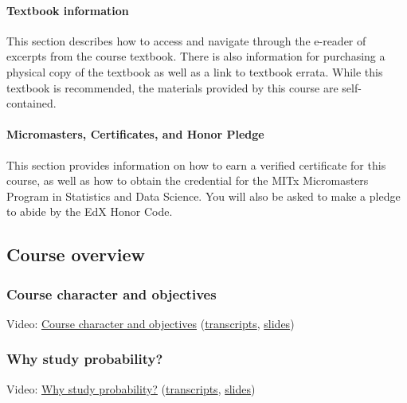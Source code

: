 \documentclass[pdftex, brazil, 12pt, twoside]{article}
\begin{document}
\paragraph{Textbook information}
This section describes how to access and navigate through the e-reader of excerpts
from the course textbook. There is also information for purchasing a physical copy
of the textbook as well as a link to textbook errata. While this textbook is
recommended, the materials provided by this course are self-contained.

\paragraph{Micromasters, Certificates, and Honor Pledge}
This section provides information on how to earn a verified certificate for this
course, as well as how to obtain the credential for the MITx Micromasters Program
in Statistics and Data Science. You will also be asked to make a pledge to abide
by the EdX Honor Code.


\subsection{Course overview}
\label{ovw0-co}

\subsubsection{Course character and objectives}
\label{ovw0-co-objectives}

Video: \href{https://www.youtube.com/watch?v=OM3iEZGC2-k}{Course character and objectives}
(\href{Unit-0/Overview1\_transcripts.pdf}{transcripts}, \href{Unit-0/Overview1\_slides.pdf}{slides})

\subsubsection{Why study probability?}
\label{ovw0-co-why}

Video: \href{https://www.youtube.com/watch?v=cvVmmboMiyY}{Why study probability?}
(\href{Unit-0/Overview2\_transcripts.pdf}{transcripts}, \href{Unit-0/Overview2\_slides.pdf}{slides})
\end{document}
